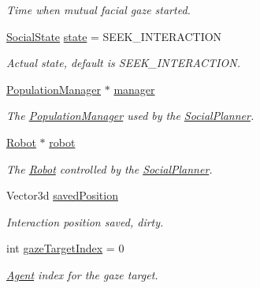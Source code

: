 \begin{DoxyCompactItemize}
\begin{DoxyCompactList}\small\item\em Time when mutual facial gaze started. \end{DoxyCompactList}\item 
\hyperlink{classSocialPlanner_acb2c5c7ab803cafef828f504b1df5f6d}{Social\+State} \hyperlink{classSocialPlanner_aeadee6941dc26e6ffcbfa5ed13b96cd0}{state} = S\+E\+E\+K\+\_\+\+I\+N\+T\+E\+R\+A\+C\+T\+I\+ON\hypertarget{classSocialPlanner_aeadee6941dc26e6ffcbfa5ed13b96cd0}{}\label{classSocialPlanner_aeadee6941dc26e6ffcbfa5ed13b96cd0}

\begin{DoxyCompactList}\small\item\em Actual state, default is S\+E\+E\+K\+\_\+\+I\+N\+T\+E\+R\+A\+C\+T\+I\+ON. \end{DoxyCompactList}\item 
\hyperlink{classPopulationManager}{Population\+Manager} $\ast$ \hyperlink{classSocialPlanner_aaed8a44f9e82ca53141f6a556365754a}{manager}\hypertarget{classSocialPlanner_aaed8a44f9e82ca53141f6a556365754a}{}\label{classSocialPlanner_aaed8a44f9e82ca53141f6a556365754a}

\begin{DoxyCompactList}\small\item\em The \hyperlink{classPopulationManager}{Population\+Manager} used by the \hyperlink{classSocialPlanner}{Social\+Planner}. \end{DoxyCompactList}\item 
\hyperlink{classRobot}{Robot} $\ast$ \hyperlink{classSocialPlanner_a5f858fb49f0ce512d6a1d524af25d1ff}{robot}\hypertarget{classSocialPlanner_a5f858fb49f0ce512d6a1d524af25d1ff}{}\label{classSocialPlanner_a5f858fb49f0ce512d6a1d524af25d1ff}

\begin{DoxyCompactList}\small\item\em The \hyperlink{classRobot}{Robot} controlled by the \hyperlink{classSocialPlanner}{Social\+Planner}. \end{DoxyCompactList}\item 
Vector3d \hyperlink{classSocialPlanner_ab105a0b94b629c396eaa4837c7234d27}{saved\+Position}\hypertarget{classSocialPlanner_ab105a0b94b629c396eaa4837c7234d27}{}\label{classSocialPlanner_ab105a0b94b629c396eaa4837c7234d27}

\begin{DoxyCompactList}\small\item\em Interaction position saved, dirty. \end{DoxyCompactList}\item 
int \hyperlink{classSocialPlanner_a82d7052c76abb4c2f233484ba60f3398}{gaze\+Target\+Index} = 0\hypertarget{classSocialPlanner_a82d7052c76abb4c2f233484ba60f3398}{}\label{classSocialPlanner_a82d7052c76abb4c2f233484ba60f3398}

\begin{DoxyCompactList}\small\item\em \hyperlink{classAgent}{Agent} index for the gaze target. \end{DoxyCompactList}\end{DoxyCompactItemize}


